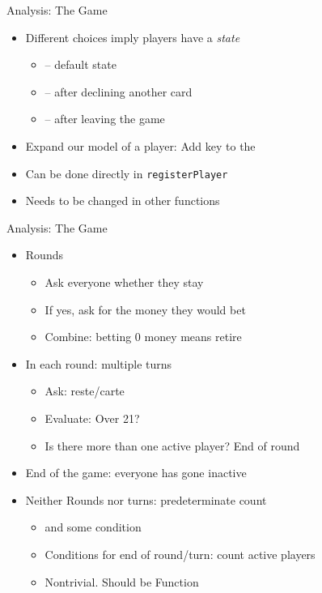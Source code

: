 
\begin{frame}[fragile]{Analysis: The Game}
%
\begin{itemize}
\item Different choices imply players have a \emph{state}
	\begin{itemize}
	\item {} -- default state
	\item {} -- after declining another card
	\item {} -- after leaving the game
	\end{itemize}
\item Expand our model of a player: Add key  to the 
\item Can be done directly in \texttt{registerPlayer}
\item Needs to be changed in other functions
\end{itemize}
%
\end{frame}


\begin{frame}[fragile]{Analysis: The Game}
%
\begin{itemize}
\item Rounds
	\begin{itemize}
	\item Ask everyone whether they stay
	\item If yes, ask for the money they would bet
	\item Combine: betting 0 money means retire
	\end{itemize}
\item In each round: multiple turns
	\begin{itemize}
	\item Ask: reste/carte
	\item Evaluate: Over 21?
	\item Is there more than one active player? \Thus End of round
	\end{itemize}
\item End of the game: everyone has gone inactive
\item Neither Rounds nor turns: predeterminate count
	\begin{itemize}
	\item[\Thus]  and some condition
	\item Conditions for end of round/turn: count active players
	\item Nontrivial. Should be Function
	\end{itemize}
\end{itemize}
%
\end{frame}

